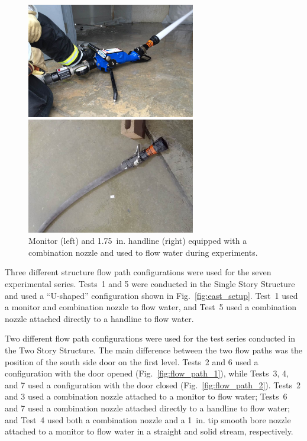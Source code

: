 \documentclass[12pt,oneside]{book}
\begin{document}
\begin{figure}[!ht]
	\minipage{3in}
	\begin{center}
		\includegraphics[width=2.9in]{../Figures/Pictures/monitor}
	\end{center} 
	\endminipage \hfill
	\minipage{3in}
	\begin{center}
		\includegraphics[width=2.9in]{../Figures/Pictures/handline}
	\end{center}
	\endminipage \hfill
	\caption[Monitor and handline equipped with a combination nozzle.]{Monitor (left) and 1.75~in. handline (right) equipped with a combination nozzle and used to flow water during experiments.}
	\label{fig:monitor+handline}
\end{figure}

Three different structure flow path configurations were used for the seven experimental series. Tests~1 and 5 were conducted in the Single Story Structure and used a ``U-shaped'' configuration shown in Fig.~\ref{fig:east_setup}. Test~1 used a monitor and combination nozzle to flow water, and Test~5 used a combination nozzle attached directly to a handline to flow water.

Two different flow path configurations were used for the test series conducted in the Two Story Structure. The main difference between the two flow paths was the position of the south side door on the first level. Tests~2 and 6 used a configuration with the door opened (Fig.~\ref{fig:flow_path_1}), while Tests~3, 4, and 7 used a configuration with the door closed (Fig.~\ref{fig:flow_path_2}). Tests~2 and 3 used a combination nozzle attached to a monitor to flow water; Tests~6 and 7 used a combination nozzle attached directly to a handline to flow water; and Test~4 used both a combination nozzle and a 1~in. tip smooth bore nozzle attached to a monitor to flow water in a straight and solid stream, respectively. 
\end{document}
